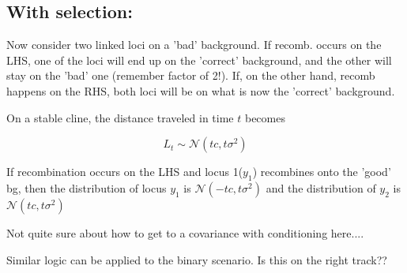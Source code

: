 \documentclass[12pt]{article}
\begin{document}
\subsection{With selection:}

Now consider two linked loci on a 'bad' background. If recomb. occurs on the LHS, one of the loci will end up on the 'correct' background, and the other will stay on the 'bad' one (remember factor of 2!). If, on the other hand, recomb happens on the RHS, both loci will be on what is now the 'correct' background.

On a stable cline, the distance traveled in time $t$ becomes

$$L_t \sim \mathcal{N}(tc,t\sigma^2)$$

If recombination occurs on the LHS and locus 1($y_1$) recombines onto the 'good' bg, then the distribution of locus $y_1$ is $\mathcal{N}(-tc,t\sigma^2)$ and the distribution of $y_2$ is $\mathcal{N}(tc,t\sigma^2)$

Not quite sure about how to get to a covariance with conditioning here....

Similar logic can be applied to the binary scenario. Is this on the right track??
\end{document}
